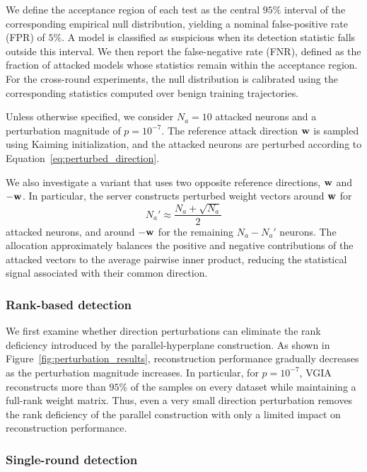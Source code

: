 We define the acceptance region of each test as the central $95\%$ interval of the corresponding empirical null distribution, yielding a nominal false-positive rate (FPR) of $5\%$. A model is classified as suspicious when its detection statistic falls outside this interval. We then report the false-negative rate (FNR), defined as the fraction of attacked models whose statistics remain within the acceptance region. For the cross-round experiments, the null distribution is calibrated using the corresponding statistics computed over benign training trajectories.

Unless otherwise specified, we consider $N_a=10$ attacked neurons and a perturbation magnitude of $p=10^{-7}$. The reference attack direction $\mathbf{w}$ is sampled using Kaiming initialization, and the attacked neurons are perturbed according to Equation~\eqref{eq:perturbed_direction}.

We also investigate a variant that uses two opposite reference directions, $\mathbf{w}$ and $-\mathbf{w}$. In particular, the server constructs perturbed weight vectors around $\mathbf{w}$ for
\begin{equation*}
N_a' \approx \frac{N_a+\sqrt{N_a}}{2}
\end{equation*}
attacked neurons, and around $-\mathbf{w}$ for the remaining $N_a-N_a'$ neurons. The allocation approximately balances the positive and negative contributions of the attacked vectors to the average pairwise inner product, reducing the statistical signal associated with their common direction.


\subsubsection{Rank-based detection} We first examine whether direction perturbations can eliminate the rank deficiency introduced by the parallel-hyperplane construction. As shown in Figure~\ref{fig:perturbation_results}, reconstruction performance gradually decreases as the perturbation magnitude increases. In particular, for $p=10^{-7}$, VGIA reconstructs more than $95\%$ of the samples on every dataset while maintaining a full-rank weight matrix. Thus, even a very small direction perturbation removes the rank deficiency of the parallel construction with only a limited impact on reconstruction performance.

\subsubsection{Single-round detection}

